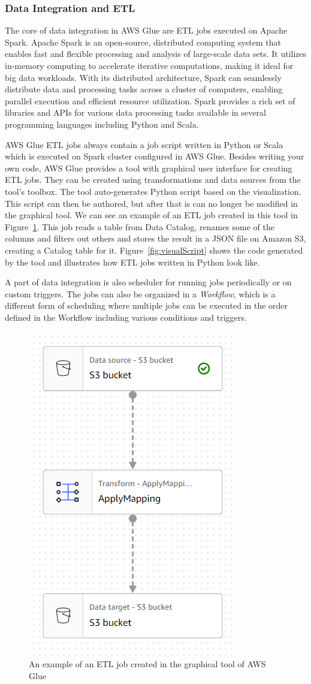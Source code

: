 \subsubsection{Data Integration and ETL}
The core of data integration in AWS Glue are ETL jobs executed on Apache Spark. Apache Spark is an open-source, distributed computing system that enables fast and flexible processing and analysis of large-scale data sets. It utilizes in-memory computing to accelerate iterative computations, making it ideal for big data workloads. With its distributed architecture, Spark can seamlessly distribute data and processing tasks across a cluster of computers, enabling parallel execution and efficient resource utilization. Spark provides a rich set of libraries and APIs for various data processing tasks available in several programming languages including Python and Scala.
\par
AWS Glue ETL jobs always contain a job script written in Python or Scala which is executed on Spark cluster configured in AWS Glue. Besides writing your own code, AWS Glue provides a tool with graphical user interface for creating ETL jobs. They can be created using transformations and data sources from the tool's toolbox. The tool auto-generates Python script based on the visualization. This script can then be authored, but after that is can no longer be modified in the graphical tool.
We can see an example of an ETL job created in this tool in Figure~\ref{fig:visualJob}. This job reads a table from Data Catalog, renames some of the columns and filters out others and stores the result in a JSON file on Amazon S3, creating a Catalog table for it. Figure~\ref{fig:visualScript} shows the code generated by the tool and illustrates how ETL jobs written in Python look like.
\par
A part of data integration is also scheduler for running jobs periodically or on custom triggers. The jobs can also be organized in a \textit{Workflow}, which is a different form of scheduling where multiple jobs can be executed in the order defined in the Workflow including various conditions and triggers.

\begin{figure}[ht]\centering
\includegraphics[height=0.6\textwidth]{img/job_example_visualization.png}
\caption{An example of an ETL job created in the graphical tool of AWS Glue}
\label{fig:visualJob}
\end{figure}


